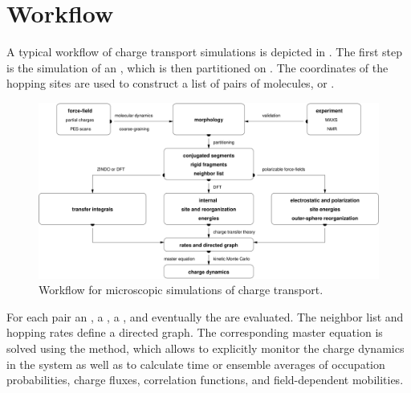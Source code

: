 \section{Workflow}
\label{sec:wokflow}

A typical workflow of charge transport simulations is depicted in . The first step is the simulation of an , which is then partitioned on . The coordinates of the hopping sites are used to construct a list of pairs of molecules, or . 

\begin{figure}[h]
   \label{fig:workflow}
\includegraphics[width=\textwidth]{fig/workflow}
 \caption{%
   Workflow for microscopic simulations of charge transport.  %
}
\end{figure}

For each pair an , a , a , and eventually the  are evaluated. The neighbor list and hopping rates define a directed graph. The corresponding master equation is solved using the  method, which allows to explicitly monitor the charge dynamics in the system as well as to calculate time or ensemble averages of occupation probabilities, charge fluxes, correlation functions, and field-dependent mobilities.

% 



